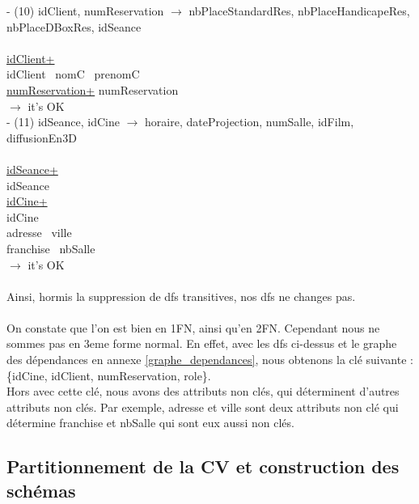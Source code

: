 \documentclass[a4paper,sffamily,12pt]{article}
\begin{document}
				\noindent - (10) idClient, numReservation $\rightarrow$ nbPlaceStandardRes, nbPlaceHandicapeRes, nbPlaceDBoxRes, idSeance \\
					\\
					\underline{idClient+} \\
					idClient \ nomC \ prenomC \\
					\underline{numReservation+}
					numReservation \\									
				$\rightarrow$ it's OK \\		

				\noindent - (11) idSeance, idCine $\rightarrow$ horaire, dateProjection, numSalle, idFilm, diffusionEn3D \\
					\\
					\underline{idSeance+} \\
					idSeance \\
					\underline{idCine+}\\
					idCine \\ adresse \ ville \\ franchise \ nbSalle \\							
				$\rightarrow$ it's OK \\							
				\\		
				\noindent Ainsi, hormis la suppression de dfs transitives, nos dfs ne changes pas. \\																
				\\
				On constate que l'on est bien en 1FN, ainsi qu'en 2FN. Cependant nous ne sommes pas en 3eme forme normal. En effet, avec les dfs ci-dessus et le graphe des dépendances en annexe \ref{graphe_dependances}, nous obtenons la clé suivante : \{idCine, idClient, numReservation, role\}. \\
				Hors avec cette clé, nous avons des attributs non clés, qui déterminent d'autres attributs non clés. Par exemple, adresse et ville sont deux attributs non clé qui détermine franchise et nbSalle qui sont eux aussi non clés. \\
				
				\vspace{0.5cm}
													
			\subsection{Partitionnement de la CV et construction des schémas} 	
			
				\vspace{0.5cm}
			
\end{document}
